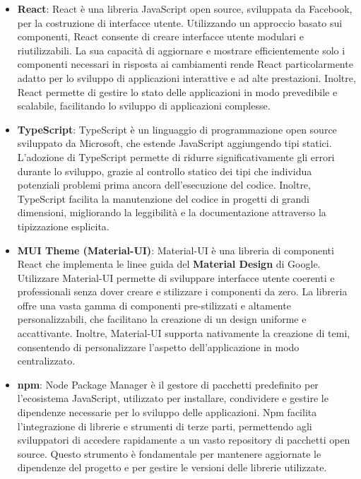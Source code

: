 \begin{itemize}
    \item \textbf{React}: React è una libreria JavaScript open source, sviluppata da Facebook, 
    per la costruzione di interfacce utente. Utilizzando un approccio basato sui componenti, 
    React consente di creare interfacce utente modulari e riutilizzabili. La sua capacità di 
    aggiornare e mostrare efficientemente solo i componenti necessari in risposta ai cambiamenti 
    rende React particolarmente adatto per lo sviluppo di applicazioni interattive e 
    ad alte prestazioni. Inoltre, React permette di gestire lo stato delle applicazioni in modo 
    prevedibile e scalabile, facilitando lo sviluppo di applicazioni complesse. 
    \cite{ReactWikipedia}
 
    \item \textbf{TypeScript}: TypeScript è un linguaggio di programmazione open source sviluppato 
    da Microsoft, che estende JavaScript aggiungendo tipi statici. 
    L'adozione di TypeScript permette di ridurre significativamente gli errori
    durante lo sviluppo, grazie al controllo statico dei tipi che individua potenziali
    problemi prima ancora dell'esecuzione del codice. Inoltre, TypeScript facilita la manutenzione 
    del codice in progetti di grandi dimensioni, migliorando la leggibilità e la documentazione attraverso
    la tipizzazione esplicita. \cite{TypescriptWikipedia}
 
    \item \textbf{MUI Theme (Material-UI)}: Material-UI è una libreria di componenti React 
    che implementa le linee guida del \textbf{Material Design} di Google. Utilizzare 
    Material-UI permette di sviluppare interfacce utente coerenti e professionali 
    senza dover creare e stilizzare i componenti da zero. La libreria offre una vasta 
    gamma di componenti pre-stilizzati e altamente personalizzabili, che facilitano la 
    creazione di un design uniforme e accattivante. Inoltre, Material-UI supporta nativamente 
    la creazione di temi, consentendo di personalizzare l'aspetto dell'applicazione in modo centralizzato.

    \item \textbf{npm}: Node Package Manager è il gestore di pacchetti predefinito 
    per l'ecosistema JavaScript, utilizzato per installare, condividere e 
    gestire le dipendenze necessarie per lo sviluppo delle applicazioni. 
    Npm facilita l'integrazione di librerie e strumenti di terze parti, 
    permettendo agli sviluppatori di accedere rapidamente a un vasto repository 
    di pacchetti open source. Questo strumento è fondamentale per mantenere 
    aggiornate le dipendenze del progetto e per gestire le versioni delle librerie utilizzate.

\end{itemize}

